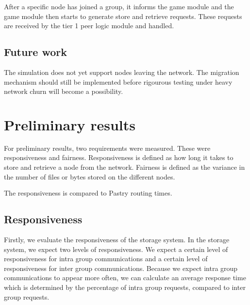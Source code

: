 \documentclass[10pt,a4paper,conference]{IEEEtran}
\begin{document}
After a specific node has joined a group, it informs the game module and the game module then starts to generate store and retrieve requests. These
requests are received by the tier 1 peer logic module and handled.

\subsection{Future work}

The simulation does not yet support nodes leaving the network. The migration mechanism should still be implemented before rigourous testing under
heavy network churn will become a possibility.



\section{Preliminary results}
\label{results}

For preliminary results, two requirements were measured. These were responsiveness and fairness. Responsiveness is defined as how long it takes to
store and retrieve a node from the network. Fairness is defined as the variance in the number of files or bytes stored on the different nodes.

The responsiveness is compared to Pastry routing times.

\subsection{Responsiveness}

Firstly, we evaluate the responsiveness of the storage system. In the storage system, we expect two levels of responsiveness. We expect a certain
level of responsiveness for intra group communications and a certain level of responsiveness for inter group communications. Because we expect intra
group communications to appear more often, we can calculate an average response time which is determined by the percentage of intra group requests,
compared to inter group requests.
\end{document}
